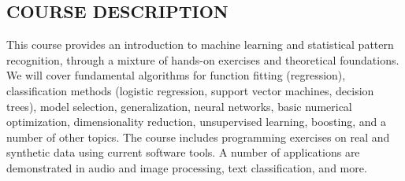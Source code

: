 \documentclass[10pt]{article}
\begin{document}
\subsection{COURSE DESCRIPTION}
This course provides an introduction to machine learning and statistical pattern recognition, through a mixture of hands-on exercises and theoretical foundations.
We will cover fundamental algorithms for function fitting (regression), classification methods (logistic regression, support vector machines, decision trees), model selection, generalization, neural networks, basic numerical optimization, dimensionality reduction, unsupervised learning, boosting, and a number of other topics. The course includes programming exercises on real and synthetic data using current software tools. A number of applications are demonstrated in audio and image processing, text classification, and more. 
\end{document}
